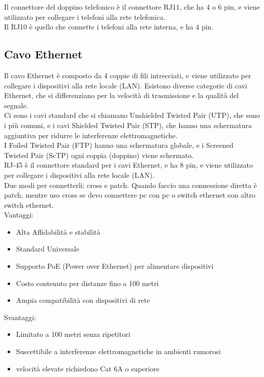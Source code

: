 Il connettore del doppino telefonico è il connettore RJ11, che ha 4 o 6 pin, e viene utilizzato per collegare i telefoni alla rete telefonica.\\
Il RJ10 è quello che connette i telefoni alla rete interna, e ha 4 pin.\\

\subsection{Cavo Ethernet}
Il cavo Ethernet è composto da 4 coppie di fili intrecciati, e viene utilizzato per collegare i dispositivi alla rete locale (LAN). 
Esistono diverse categorie di cavi Ethernet, che si differenziano per la velocità di trasmissione e la qualità del segnale.\\

Ci sono i cavi standard che si chiamano Unshielded Twisted Pair (UTP), che sono i più comuni, e i cavi Shielded Twisted Pair (STP), che hanno una schermatura aggiuntiva per ridurre le interferenze elettromagnetiche.\\
I Foiled Twisted Pair (FTP) hanno una schermatura globale, e i Screened Twisted Pair (ScTP) ogni coppia (doppino) viene schermato.\\

RJ-45 è il connettore standard per i cavi Ethernet, e ha 8 pin, e viene utilizzato per collegare i dispositivi alla rete locale (LAN).\\

Due modi per connetterli: cross e patch.
Quando faccio una connessione diretta è patch, mentre uso cross se devo connettere pc con pc o switch ethernet con altro switch ethernet.\\

Vantaggi:
\begin{itemize}
    \item Alta Affidabilità e stabilità
    \item Standard Universale
    \item Supporto PoE (Power over Ethernet) per alimentare dispositivi
    \item Costo contenuto per distanze fino a 100 metri
    \item Ampia compatibilità con dispositivi di rete
\end{itemize}

Svantaggi:
\begin{itemize}
    \item Limitato a 100 metri senza ripetitori
    \item Suscettibile a interferenze elettromagnetiche in ambienti rumorosi
    \item velocità elevate richiedono Cat 6A o superiore
\end{itemize}

